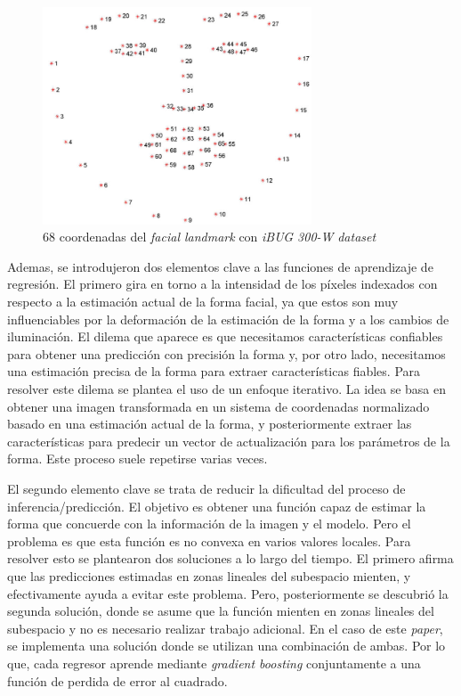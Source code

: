 \begin{figure}[htp]
	\centering
	\includegraphics[width=8cm]{imagenes/facial_landmarks_68markup.jpg}
	\caption{68 coordenadas del \textit{facial landmark} con \textit{iBUG 300-W} \textit{dataset}}
	\label{fig:dlibPoints}
\end{figure}

Ademas, se introdujeron dos elementos clave a las funciones de aprendizaje de regresión. El primero gira en torno a la intensidad de los píxeles indexados con respecto a la estimación actual de la forma facial, ya que estos son muy influenciables por la deformación de la estimación de la forma y a los cambios de iluminación. El dilema que aparece es que necesitamos características confiables para obtener una predicción con precisión la forma y, por otro lado, necesitamos una estimación precisa de la forma para extraer características fiables. Para resolver este dilema se plantea el uso de un enfoque iterativo. La idea se basa en obtener una imagen transformada en un sistema de coordenadas normalizado basado en una estimación actual de la forma, y posteriormente extraer las características para predecir un vector de actualización para los parámetros de la forma. Este proceso suele repetirse varias veces.

El segundo elemento clave se trata de reducir la dificultad del proceso de inferencia/predicción. El objetivo es obtener una función capaz de estimar la forma que concuerde con la información de la imagen y el modelo. Pero el problema es que esta función es no convexa en varios valores locales. Para resolver esto se plantearon dos soluciones a lo largo del tiempo. El primero afirma que las predicciones estimadas en zonas lineales del subespacio mienten, y efectivamente ayuda a evitar este problema. Pero, posteriormente se descubrió la segunda solución, donde se asume que la función mienten en zonas lineales del subespacio y no es necesario realizar trabajo adicional. En el caso de este \textit{paper}, se implementa una solución donde se utilizan una combinación de ambas. Por lo que, cada regresor aprende mediante \textit{gradient boosting} conjuntamente a una función de perdida de error al cuadrado.

